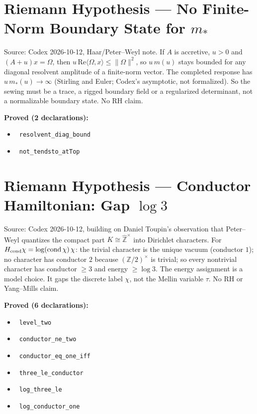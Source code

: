\documentclass{report}
\theoremstyle{definition}
\begin{document}
\section{Riemann Hypothesis --- No Finite-Norm Boundary State for $m_*$}
Source: Codex 2026-10-12, Haar/Peter--Weyl note. If $A$ is accretive, $u>0$ and $(A+u)x=\Omega$, then $u\,\mathrm{Re}\langle\Omega,x\rangle\le\|\Omega\|^2$, so $u\,m(u)$ stays bounded for any diagonal resolvent amplitude of a finite-norm vector. The completed response has $u\,m_*(u)\to\infty$ (Stirling and Euler; Codex's asymptotic, not formalized). So the sewing must be a trace, a rigged boundary field or a regularized determinant, not a normalizable boundary state. No RH claim.

\noindent\textbf{Proved (2 declarations):}
\begin{itemize}
  \item {}\leanok\ \texttt{resolvent\_diag\_bound}
  \item {}\leanok\ \texttt{not\_tendsto\_atTop}
\end{itemize}

\section{Riemann Hypothesis --- Conductor Hamiltonian: Gap $\log 3$}
Source: Codex 2026-10-12, building on Daniel Toupin's observation that Peter--Weyl quantizes the compact part $K\cong\hat{\mathbb Z}^\times$ into Dirichlet characters. For $H_{\rm cond}\chi=\log(\mathrm{cond}\,\chi)\,\chi$: the trivial character is the unique vacuum (conductor $1$); no character has conductor $2$ because $(\mathbb Z/2)^\times$ is trivial; so every nontrivial character has conductor $\ge3$ and energy $\ge\log3$. The energy assignment is a model choice. It gaps the discrete label $\chi$, not the Mellin variable $\tau$. No RH or Yang--Mills claim.

\noindent\textbf{Proved (6 declarations):}
\begin{itemize}
  \item {}\leanok\ \texttt{level\_two}
  \item {}\leanok\ \texttt{conductor\_ne\_two}
  \item {}\leanok\ \texttt{conductor\_eq\_one\_iff}
  \item {}\leanok\ \texttt{three\_le\_conductor}
  \item {}\leanok\ \texttt{log\_three\_le}
  \item {}\leanok\ \texttt{log\_conductor\_one}
\end{itemize}
\end{document}
